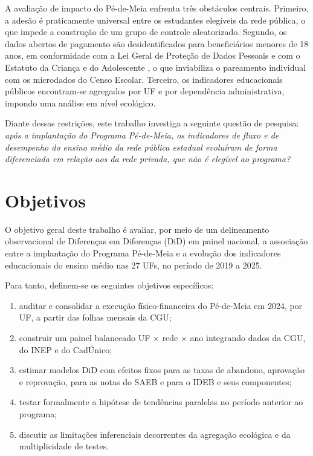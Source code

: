 A avaliação de impacto do Pé-de-Meia enfrenta três obstáculos centrais.
Primeiro, a adesão é praticamente universal entre os estudantes elegíveis da rede pública, o que impede a construção de um grupo de controle aleatorizado.
Segundo, os dados abertos de pagamento são desidentificados para beneficiários menores de 18 anos, em conformidade com a Lei Geral de Proteção de Dados Pessoais \cite{Brasil2018LGPD} e com o Estatuto da Criança e do Adolescente \cite{Brasil1990ECA}, o que inviabiliza o pareamento individual com os microdados do Censo Escolar.
Terceiro, os indicadores educacionais públicos encontram-se agregados por UF e por dependência administrativa, impondo uma análise em nível ecológico.

Diante dessas restrições, este trabalho investiga a seguinte questão de pesquisa: \textit{após a implantação do Programa Pé-de-Meia, os indicadores de fluxo e de desempenho do ensino médio da rede pública estadual evoluíram de forma diferenciada em relação aos da rede privada, que não é elegível ao programa?}

\section{Objetivos}
\label{sec_objetivos}

O objetivo geral deste trabalho é avaliar, por meio de um delineamento observacional de Diferenças em Diferenças (DiD) em painel nacional, a associação entre a implantação do Programa Pé-de-Meia e a evolução dos indicadores educacionais do ensino médio nas 27 UFs, no período de 2019 a 2025.

Para tanto, definem-se os seguintes objetivos específicos:

\begin{enumerate}
    \item auditar e consolidar a execução físico-financeira do Pé-de-Meia em 2024, por UF, a partir das folhas mensais da CGU;
    \item construir um painel balanceado UF $\times$ rede $\times$ ano integrando dados da CGU, do INEP e do CadÚnico;
    \item estimar modelos DiD com efeitos fixos para as taxas de abandono, aprovação e reprovação, para as notas do SAEB e para o IDEB e seus componentes;
    \item testar formalmente a hipótese de tendências paralelas no período anterior ao programa;
    \item discutir as limitações inferenciais decorrentes da agregação ecológica e da multiplicidade de testes.
\end{enumerate}

